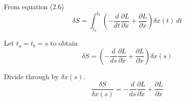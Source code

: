 


\bigskip
From equation (2.6)
\begin{equation*}
\delta S=\int_{t_a}^{t_b}\left(-\frac{d}{dt}\frac{\partial L}{\partial\dot x}
+\frac{\partial L}{\partial x}\right)\delta x(t)\,dt
\end{equation*}

Let $t_a=t_b=s$ to obtain
\begin{equation*}
\delta S=\left(-\frac{d}{ds}\frac{\partial L}{\partial\dot x}
+\frac{\partial L}{\partial x}\right)\delta x(s)
\end{equation*}

Divide through by $\delta x(s)$.
\begin{equation*}
\frac{\delta S}{\delta x(s)}=
-\frac{d}{ds}\frac{\partial L}{\partial\dot x}
+\frac{\partial L}{\partial x}
\end{equation*}


